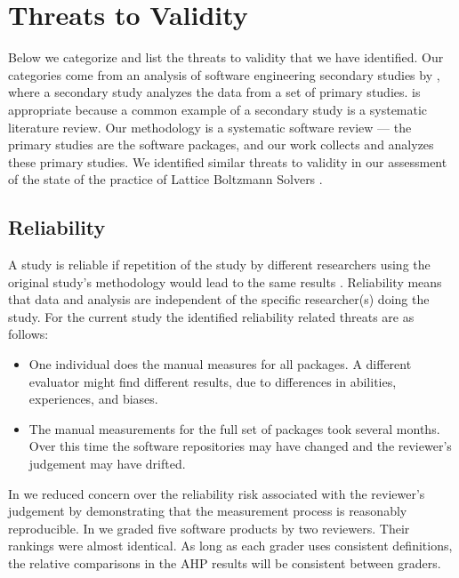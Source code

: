 \documentclass[final, 12pt, 3p, times]{elsarticle}
\begin{document}
\section{Threats to Validity} \label{sec_threats_to_validity}

Below we categorize and list the threats to validity that we have identified.
Our categories come from an analysis of software engineering secondary studies
by \cite{AmpatzoglouEtAl2019}, where a secondary study analyzes the data from a
set of primary studies.  \cite{AmpatzoglouEtAl2019} is appropriate because a
common example of a secondary study is a systematic literature review. Our
methodology is a systematic software review --- the primary studies are the
software packages, and our work collects and analyzes these primary studies.  We
identified similar threats to validity in our assessment of the state of the
practice of Lattice Boltzmann Solvers \cite{SmithEtAl2024}.

\subsection{Reliability}

A study is reliable if repetition of the study by different researchers using
the original study's methodology would lead to the same results
\cite{RunesonAndHost2009}. Reliability means that data and analysis are
independent of the specific researcher(s) doing the study.  For the current
study the identified reliability related threats are as follows:

\begin{itemize}
\item One individual does the manual measures for all packages. A different
evaluator might find different results, due to differences in abilities,
experiences, and biases.
\item The manual measurements for the full set of packages took several months.
Over this time the software repositories may have changed and the reviewer's
judgement may have drifted.
\end{itemize}

In \cite{SmithEtAl2016} we reduced concern over the reliability risk associated
with the reviewer's judgement by demonstrating that the measurement process is
reasonably reproducible.  In \cite{SmithEtAl2016} we graded five software
products by two reviewers. Their rankings were almost identical. As long as each
grader uses consistent definitions, the relative comparisons in the AHP results
will be consistent between graders.
\end{document}
